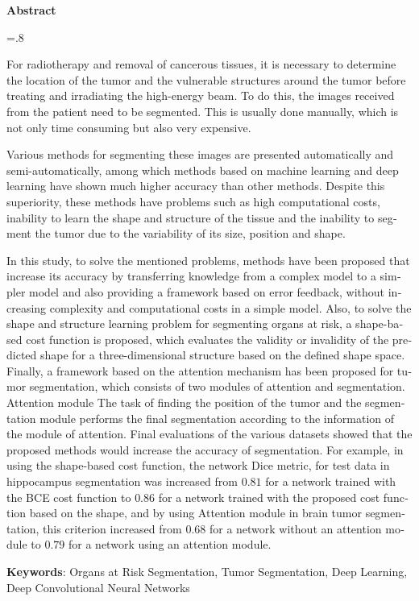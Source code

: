 


\pagestyle{empty}

\begin{latin}

\begin{center}
\textbf{Abstract}
\end{center}
\baselineskip=.8\baselineskip

For radiotherapy and removal of cancerous tissues, it is necessary to determine the location of the tumor and the vulnerable structures around the tumor before treating and irradiating the high-energy beam. To do this, the images received from the patient need to be segmented. This is usually done manually, which is not only time consuming but also very expensive.

Various methods for segmenting these images are presented automatically and semi-automatically, among which methods based on machine learning and deep learning have shown much higher accuracy than other methods. Despite this superiority, these methods have problems such as high computational costs, inability to learn the shape and structure of the tissue and the inability to segment the tumor due to the variability of its size, position and shape.

In this study, to solve the mentioned problems, methods have been proposed that increase its accuracy by transferring knowledge from a complex model to a simpler model and also providing a framework based on error feedback, without increasing complexity and computational costs in a simple model. Also, to solve the shape and structure learning problem for segmenting organs at risk, a shape-based cost function is proposed, which evaluates the validity or invalidity of the predicted shape for a three-dimensional structure based on the defined shape space. Finally, a framework based on the attention mechanism has been proposed for tumor segmentation, which consists of two modules of attention and segmentation. Attention module The task of finding the position of the tumor and the segmentation module performs the final segmentation according to the information of the module of attention. Final evaluations of the various datasets showed that the proposed methods would increase the accuracy of segmentation. For example, in using the shape-based cost function, the network Dice metric, for test data in hippocampus segmentation was increased from $0.81$ for a network trained with the BCE cost function to $0.86$ for a network trained with the proposed cost function based on the shape, and by using Attention module in brain tumor segmentation, this criterion increased from $0.68$ for a network without an attention module to $0.79$ for a network using an attention module.

\bigskip\noindent\textbf{Keywords}:
Organs at Risk Segmentation, Tumor Segmentation, Deep Learning, Deep Convolutional Neural Networks

\end{latin}

\newpage
